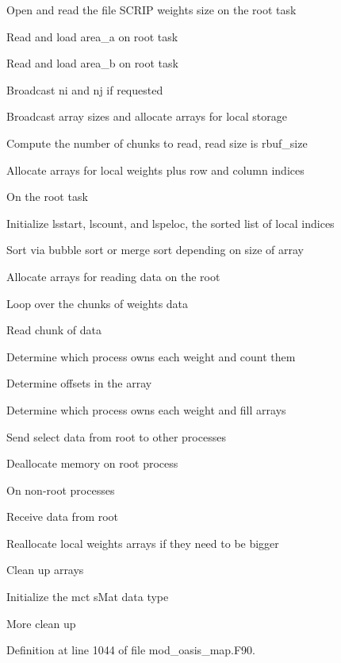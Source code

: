 \begin{DoxyItemize}
\item Open and read the file S\+C\+R\+IP weights size on the root task
\item Read and load area\+\_\+a on root task
\item Read and load area\+\_\+b on root task
\item Broadcast ni and nj if requested
\item Broadcast array sizes and allocate arrays for local storage
\item Compute the number of chunks to read, read size is rbuf\+\_\+size
\item Allocate arrays for local weights plus row and column indices
\item On the root task
\begin{DoxyItemize}
\item Initialize lsstart, lscount, and lspeloc, the sorted list of local indices
\item Sort via bubble sort or merge sort depending on size of array
\item Allocate arrays for reading data on the root
\item Loop over the chunks of weights data
\item Read chunk of data
\item Determine which process owns each weight and count them
\item Determine offsets in the array
\item Determine which process owns each weight and fill arrays
\item Send select data from root to other processes
\item Deallocate memory on root process
\end{DoxyItemize}
\item On non-\/root processes
\begin{DoxyItemize}
\item Receive data from root
\item Reallocate local weights arrays if they need to be bigger
\end{DoxyItemize}
\item Clean up arrays
\item Initialize the mct s\+Mat data type
\item More clean up 
\end{DoxyItemize}

Definition at line 1044 of file mod\+\_\+oasis\+\_\+map.\+F90.

